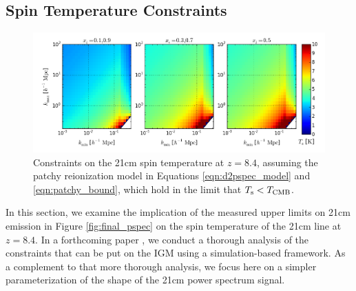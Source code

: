 \documentclass[twocolumn,numberedappendix]{emulateapj} \shorttitle{New Limits on the 21 cm Power Spectrum at $z=8.4$}
\begin{document}
\subsection{Spin Temperature Constraints}

\begin{figure}\centering
\includegraphics[width=2\columnwidth]{plots/ts_patchy_bound.png}
\caption{Constraints on the 21cm spin temperature at $z=8.4$, 
assuming 
the patchy reionization model in Equations
\eqref{eqn:d2pspec_model} and \eqref{eqn:patchy_bound}, which hold in the limit
that $T_{\rm s}<T_{\rm CMB}$.
} \label{fig:patchy_bound}
\end{figure}

In this section, we examine the implication of the measured upper limits
on 21cm emission in Figure \ref{fig:final_pspec} on the spin temperature
of the 21cm line at $z=8.4$.
In a forthcoming paper \citep{pober_et_al2015}, we conduct a thorough analysis of the
constraints that can be put on the IGM using a simulation-based framework.
As a complement to that more thorough
analysis, we focus here on a simpler parameterization of the shape
of the 21cm power spectrum signal. 
\end{document}

